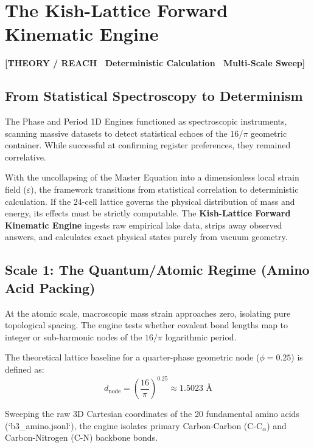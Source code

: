 \documentclass[11pt, letterpaper, openany]{book}
\begin{document}
\chapter{The Kish-Lattice Forward Kinematic Engine}

\begin{center}
{\color{theorytag}\textbf{[THEORY / REACH \textbullet\ Deterministic Calculation \textbullet\ Multi-Scale Sweep]}}
\end{center}

\section{From Statistical Spectroscopy to Determinism}

The Phase and Period 1D Engines functioned as spectroscopic instruments, scanning massive datasets to detect statistical echoes of the $16/\pi$ geometric container. While successful at confirming register preferences, they remained correlative. 

With the uncollapsing of the Master Equation into a dimensionless local strain field ($\varepsilon$), the framework transitions from statistical correlation to deterministic calculation. If the 24-cell lattice governs the physical distribution of mass and energy, its effects must be strictly computable. The \textbf{Kish-Lattice Forward Kinematic Engine} ingests raw empirical lake data, strips away observed answers, and calculates exact physical states purely from vacuum geometry.

\section{Scale 1: The Quantum/Atomic Regime (Amino Acid Packing)}

At the atomic scale, macroscopic mass strain approaches zero, isolating pure topological spacing. The engine tests whether covalent bond lengths map to integer or sub-harmonic nodes of the $16/\pi$ logarithmic period.

The theoretical lattice baseline for a quarter-phase geometric node ($\phi = 0.25$) is defined as:
\[d_{\text{node}} = \left(\frac{16}{\pi}\right)^{0.25} \approx 1.5023 \text{ \AA}\]

Sweeping the raw 3D Cartesian coordinates of the 20 fundamental amino acids (`b3_amino.jsonl`), the engine isolates primary Carbon-Carbon (C-C$_\alpha$) and Carbon-Nitrogen (C-N) backbone bonds.
\end{document}
